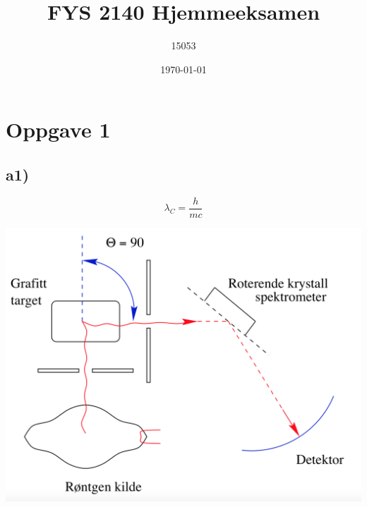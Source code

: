 \documentclass[norsk,a4paper,12pt]{article}
\title{FYS 2140 Hjemmeeksamen}
\author{15053}
\date{\today}
\begin{document}
\maketitle



\section*{Oppgave 1}

\subsection*{a1)}

\begin{equation}
\lambda_C = \frac{h}{mc}
\end{equation}




\includegraphics[scale=0.4]{compton}
\end{document}
